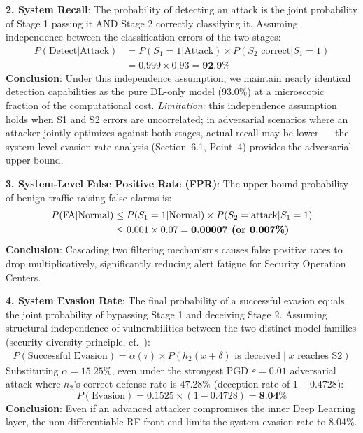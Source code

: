 \documentclass[sigconf]{acmart}
\begin{document}
\textbf{2. System Recall}: The probability of detecting an attack is the joint probability of Stage 1 passing it AND Stage 2 correctly classifying it. Assuming independence between the classification errors of the two stages:
\begin{align*}
P(\text{Detect}|\text{Attack}) &= P(S_1=1|\text{Attack}) \times P(S_2 \text{ correct}|S_1=1) \\
                               &= 0.999 \times 0.93 = \textbf{92.9\%}
\end{align*}
\textbf{Conclusion}: Under this independence assumption, we maintain nearly identical detection capabilities as the pure DL-only model (93.0\%) at a microscopic fraction of the computational cost. \emph{Limitation}: this independence assumption holds when S1 and S2 errors are uncorrelated; in adversarial scenarios where an attacker jointly optimizes against both stages, actual recall may be lower --- the system-level evasion rate analysis (Section~6.1, Point~4) provides the adversarial upper bound.

\textbf{3. System-Level False Positive Rate (FPR)}: The upper bound probability of benign traffic raising false alarms is:
\begin{align*}
P(\text{FA}|\text{Normal}) &\leq P(S_1=1|\text{Normal}) \times P(S_2=\text{attack}|S_1=1) \\
                           &\leq 0.001 \times 0.07 = \textbf{0.00007\ \text{(or 0.007\%)}}
\end{align*}
\textbf{Conclusion}: Cascading two filtering mechanisms causes false positive rates to drop multiplicatively, significantly reducing alert fatigue for Security Operation Centers.

\textbf{4. System Evasion Rate}: The final probability of a successful evasion equals the joint probability of bypassing Stage 1 and deceiving Stage 2. Assuming structural independence of vulnerabilities between the two distinct model families (security diversity principle, cf.\ \cite{15}):
\begin{align*}
P(\text{Successful Evasion}) = \alpha(\tau) \times P(h_2(x+\delta) \text{ is deceived} \mid x \text{ reaches S2})
\end{align*}
Substituting $\alpha=15.25\%$, even under the strongest PGD $\varepsilon=0.01$ adversarial attack where $h_2$'s correct defense rate is $47.28\%$ (deception rate of $1 - 0.4728$):
$$ P(\text{Evasion}) = 0.1525 \times (1 - 0.4728) = \textbf{8.04\%} $$
\textbf{Conclusion}: Even if an advanced attacker compromises the inner Deep Learning layer, the non-differentiable RF front-end limits the system evasion rate to 8.04\%.
\end{document}
